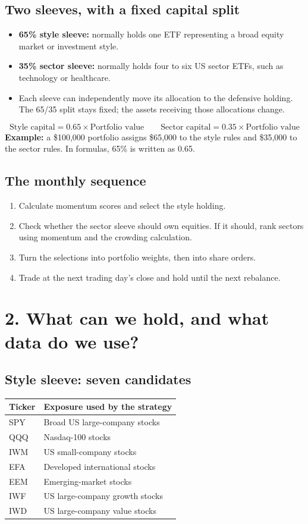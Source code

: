 \documentclass[11pt,letterpaper]{article}
\newcommand{\topic}[1]{\Needspace{5\baselineskip}\subsection*{#1}}
\newcommand{\word}[1]{\text{#1}}
\newcommand{\guidepage}[1]{\clearpage\section*{#1}}
\begin{document}
\topic{Two sleeves, with a fixed capital split}
\begin{itemize}
\item \textbf{65\% style sleeve:} normally holds one ETF representing a broad equity market or investment style.
\item \textbf{35\% sector sleeve:} normally holds four to six US sector ETFs, such as technology or healthcare.
\item Each sleeve can independently move its allocation to the defensive holding. The 65/35 split stays fixed; the assets receiving those allocations change.
\end{itemize}
\[
\word{Style capital}=0.65\times\word{Portfolio value}
\qquad
\word{Sector capital}=0.35\times\word{Portfolio value}
\]
\textbf{Example:} a \$100,000 portfolio assigns \$65,000 to the style rules and \$35,000 to the sector rules. In formulas, 65\% is written as 0.65.

\topic{The monthly sequence}
\begin{enumerate}
\item Calculate momentum scores and select the style holding.
\item Check whether the sector sleeve should own equities. If it should, rank sectors using momentum and the crowding calculation.
\item Turn the selections into portfolio weights, then into share orders.
\item Trade at the next trading day's close and hold until the next rebalance.
\end{enumerate}

\guidepage{2. What can we hold, and what data do we use?}
\topic{Style sleeve: seven candidates}
\begin{center}
\begin{tabularx}{0.95\linewidth}{@{}lX@{}}
\toprule
\textbf{Ticker} & \textbf{Exposure used by the strategy}\\
\midrule
SPY & Broad US large-company stocks\\
QQQ & Nasdaq-100 stocks\\
IWM & US small-company stocks\\
EFA & Developed international stocks\\
EEM & Emerging-market stocks\\
IWF & US large-company growth stocks\\
IWD & US large-company value stocks\\
\bottomrule
\end{tabularx}
\end{center}
\end{document}
